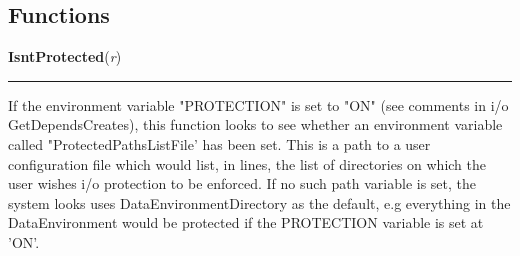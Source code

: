   \subsection{Functions}

    \label{System:system_io_override:IsntProtected}

    \vspace{0.5ex}

\hspace{.8\funcindent}\begin{boxedminipage}{\funcwidth}

    \raggedright \textbf{IsntProtected}(\textit{r})

    \vspace{-1.5ex}

    \rule{\textwidth}{0.5\fboxrule}
\setlength{\parskip}{2ex}
    If the environment variable "PROTECTION" is set to "ON" (see comments 
    in i/o GetDependsCreates), this function looks to see whether an 
    environment variable called "ProtectedPathsListFile' has been set. This
    is a path to a user configuration file which would list, in lines, the 
    list of directories on which the user wishes i/o protection to be 
    enforced.   If no such path variable is set, the system looks uses 
    DataEnvironmentDirectory as the default, e.g everything in the 
    DataEnvironment would be protected if the PROTECTION variable is set at
    'ON'.

\setlength{\parskip}{1ex}
    \end{boxedminipage}

    \label{System:system_io_override:GetDependsCreates}

    \vspace{0.5ex}

